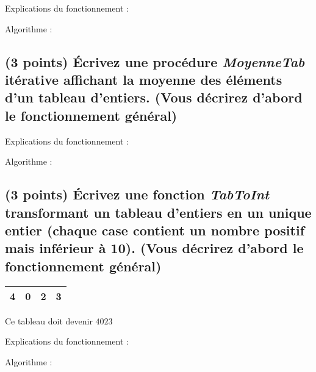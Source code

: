 \documentclass[11pt,a4paper]{article}
\begin{document}
\begin{center}
Explications du fonctionnement :

Algorithme :
\end{center}




\subsection{(3 points) \'Ecrivez une procédure \og \textit{MoyenneTab} \fg{} itérative affichant la moyenne des éléments d'un tableau d'entiers. (Vous décrirez d'abord le fonctionnement général) }


\begin{center}
Explications du fonctionnement :

Algorithme :
\end{center}




\subsection{(3 points) \'Ecrivez une fonction \og \textit{TabToInt} \fg{} transformant un tableau d'entiers en un unique entier (chaque case contient un nombre positif mais inférieur à 10). (Vous décrirez d'abord le fonctionnement général) }


\begin{center}
  \begin{tabular}{| c | c | c | c |}
    \hline
    4 & 0 & 2 & 3 \\
    \hline
  \end{tabular}

  \smallskip

  Ce tableau doit devenir $ 4023 $
\end{center}


\begin{center}
Explications du fonctionnement :

Algorithme :
\end{center}
\end{document}
